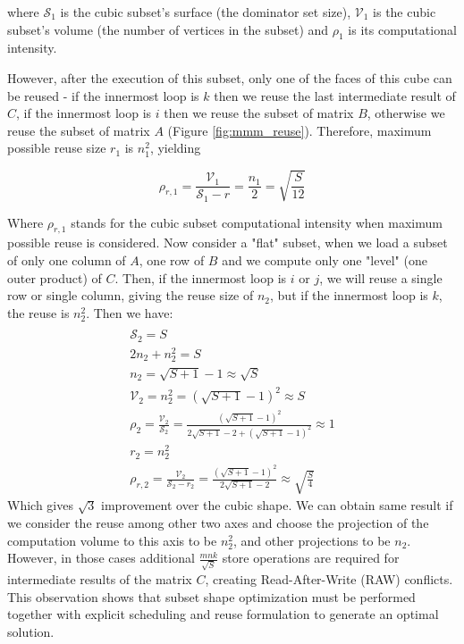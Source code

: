 \documentclass[sigconf]{acmart}
\begin{document}
where $\mathcal{S}_1$ is the cubic subset's surface (the dominator set 
size), 
$\mathcal{V}_1$ is the cubic subset's volume (the number of vertices in 
the 
subset) and $\rho_1$ is its computational intensity.

However, after the execution of this subset, only one of the faces of 
this cube can be reused - if the innermost loop is $k$ then we reuse the 
last intermediate result of $C$, if the innermost loop is $i$ then we reuse 
the subset of matrix $B$, otherwise we reuse the subset of matrix $A$ 
(Figure \ref{fig:mmm_reuse}). Therefore, maximum possible reuse size $r_1$ 
is 
$n_1^2$, yielding 

$$\rho_{r,1} = \frac{\mathcal{V}_1}{\mathcal{S}_1 - r} = \frac{n_1}{2} = 
\sqrt{\frac{S}{12}}$$

Where $\rho_{r,1}$ stands for the cubic subset computational intensity 
when maximum 
possible reuse is considered. Now consider a "flat" subset, when we load 
a subset of only one column of $A$, one row of $B$ and we compute only one 
"level" (one outer product) of $C$. Then, if the innermost loop is $i$ or 
$j$, we will reuse a single row or single column, giving the reuse size of 
$n_2$, but if the innermost loop is $k$, the reuse is $n_2^2$. Then we 
have: 	
\begin{multline}
\label{eq:flat}
\\
\mathcal{S}_2 = S \\
2n_2 + n_2^2 = S \\
n_2 = \sqrt{S + 1} - 1 \approx \sqrt{S} \\
\mathcal{V}_2 = n_2^2 = (\sqrt{S + 1} - 1)^2  \approx S\\
\rho_2 = \frac{\mathcal{V}_2}{\mathcal{S}_2} = \frac{(\sqrt{S + 1} - 
	1)^2}{2\sqrt{S+1} - 2 + (\sqrt{S + 1} - 1)^2} \approx 1\\
r_2 = n_2^2 \\
\rho_{r,2} = \frac{\mathcal{V}_2}{\mathcal{S}_2 - r_2} = \frac{(\sqrt{S + 
		1} - 
	1)^2}{2\sqrt{S+1} - 2} \approx \sqrt{\frac{S}{4}} 
\end{multline}	
Which gives $\sqrt{3}$ improvement over the cubic shape. We can obtain same 
result if we consider the reuse among other two axes and choose the 
projection of the computation volume to this axis to be $n_2^2$, and other 
projections to be $n_2$. However, in those cases additional 
$\frac{mnk}{\sqrt{S}}$ 
store operations are required for intermediate results of the matrix $C$, 
creating Read-After-Write (RAW) conflicts. This 
observation shows that subset shape 
optimization must be performed together with explicit scheduling and reuse 
formulation to generate an optimal solution.
\end{document}
